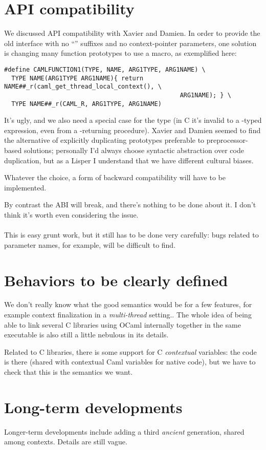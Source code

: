\documentclass[a4paper,twoside,12pt]{article}
\begin{document}
\section{API compatibility}
We discussed API compatibility with Xavier and Damien.  In order to
provide the old interface with no ``'' suffixes and no
context-pointer parameters, one solution is changing many function
prototypes to use a macro, as exemplified here:
\begin{Verbatim}
#define CAMLFUNCTION1(TYPE, NAME, ARG1TYPE, ARG1NAME) \
  TYPE NAME(ARG1TYPE ARG1NAME){ return NAME##_r(caml_get_thread_local_context(), \
                                                ARG1NAME); } \
  TYPE NAME##_r(CAML_R, ARG1TYPE, ARG1NAME)
\end{Verbatim}
It's ugly, and we also need a special case for the type 
(in C it's invalid to \CODE{return} a -typed expression,
even from a -returning procedure).  Xavier and Damien
seemed to find the alternative of explicitly duplicating prototypes
preferable to preprocessor-based solutions; personally I'd always
choose syntactic abstraction over code duplication, but as a Lisper I
understand that we have different cultural biases.

Whatever the choice, a form of backward compatibility will have to
be implemented.

By contrast the ABI will break, and there's nothing to be done about
it.  I don't think it's worth even considering the issue.
\\
\\
This is easy grunt work, but it still has to be done very carefully:
bugs related to parameter names, for example, will be difficult to find.


\section{Behaviors to be clearly defined}
We don't really know what the good semantics would be for a few
features, for example context finalization in a \textit{multi-thread}
setting..  The whole idea of being able to link several C libraries
using OCaml internally together in the same executable is also still a
little nebulous in its details.

Related to C libraries, there is some support for C
\textit{contextual} variables: the code is there (shared with
contextual Caml variables for native code), but we have to check that
this is the semantics we want.

\section{Long-term developments}
Longer-term developments include adding a third \textit{ancient}
generation, shared among contexts.  Details are still vague.
\end{document}
